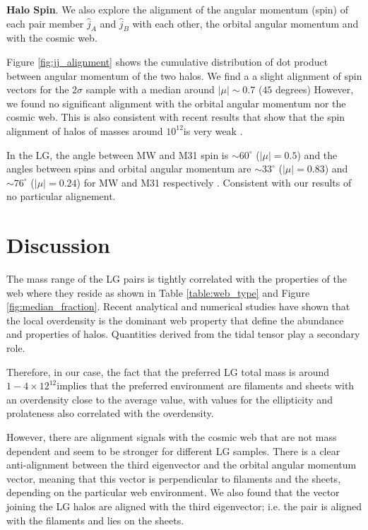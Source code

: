 \documentclass{emulateapj}
\newcommand{\Msun}{{\ifmmode{{\rm {M_{\odot}}}}\else{${\rm{M_{\odot}}}$}\fi}}
\begin{document}
{\bf Halo Spin}. We also explore the alignment of the  angular
momentum (spin) of each pair member $\hat{j}_A$ and $\hat{j}_B$ with
each other, the orbital angular momentum and with the cosmic web. 

Figure \ref{fig:jj_alignment} shows the cumulative distribution of dot
product between angular momentum of the  two halos. We find a a slight
alignment of spin vectors for the $2\sigma$ sample with a median around
$|\mu|\sim 0.7$ ($45$ degrees) However, we found no significant
alignment with the orbital angular momentum nor the cosmic web. This
is also consistent with recent results that show that the spin
alignment of halos of masses around $10^{12}$\Msun is very weak
\citep{ForeroRomero2014}. 
 
In the LG, the angle between MW and M31 spin is $\sim60^{\circ}$
($|\mu|=0.5$) and the angles between spins and orbital angular
momentum are $\sim33^{\circ}$ ($|\mu|=0.83$) and $\sim76^{\circ}$
($|\mu|=0.24$) for MW and M31 respectively
\citep{2012ApJ...753....9V}. Consistent with our results of no particular
alignement.

\section{Discussion}
\label{sec:discussion}

The mass range of the LG pairs is tightly correlated with the
properties of the web where they reside as shown in Table
\ref{table:web_type} and Figure \ref{fig:median_fraction}. Recent
analytical \citep{Alonso2014} and numerical studies \citep{Metuki2014}
have shown that the local overdensity is the dominant web property
that define the abundance and properties of halos. Quantities derived
from the tidal tensor play a secondary role. 

Therefore, in our case, the fact that the preferred LG total mass is
around $1-4\times 12^{12}$\Msun implies that the preferred environment
are filaments and sheets with an overdensity close to the average
value, with values for the ellipticity and prolateness also correlated
with the overdensity.

However, there are alignment signals with the cosmic web that are not
mass dependent and seem to be stronger for different LG samples. There
is a clear anti-alignment between the third eigenvector and the
orbital angular momentum vector, meaning that this vector is
perpendicular to filaments and the sheets, depending on the
particular web environment. We also found that the vector joining the
LG halos are aligned with the third eigenvector; i.e. the pair is
aligned with the filaments and lies on the sheets.
\end{document}
